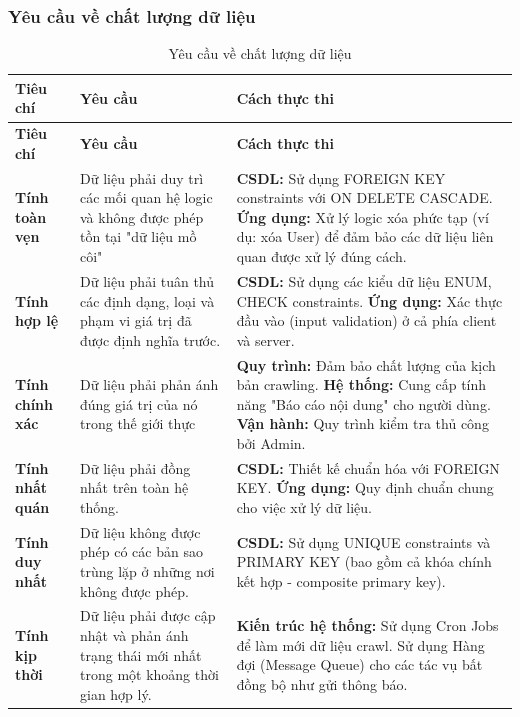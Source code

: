 \subsubsection{Yêu cầu về chất lượng dữ liệu}
\begin{longtable}{|p{3cm}|p{5.5cm}|p{6cm}|}
    \caption{Yêu cầu về chất lượng dữ liệu} \label{tab:data_quality} \\
    \hline
    \textbf{Tiêu chí} & \textbf{Yêu cầu} & \textbf{Cách thực thi} \\
    \hline
    \endfirsthead
    
    \hline
    \textbf{Tiêu chí} & \textbf{Yêu cầu} & \textbf{Cách thực thi} \\
    \hline
    \endhead

    \hline
    \endlastfoot

    \textbf{Tính toàn vẹn} & Dữ liệu phải duy trì các mối quan hệ logic và không được phép tồn tại "dữ liệu mồ côi" & \textbf{CSDL:} Sử dụng FOREIGN KEY constraints với ON DELETE CASCADE. \newline \textbf{Ứng dụng:} Xử lý logic xóa phức tạp (ví dụ: xóa User) để đảm bảo các dữ liệu liên quan được xử lý đúng cách. \\
    \hline
    \textbf{Tính hợp lệ} & Dữ liệu phải tuân thủ các định dạng, loại và phạm vi giá trị đã được định nghĩa trước. & \textbf{CSDL:} Sử dụng các kiểu dữ liệu ENUM, CHECK constraints. \newline \textbf{Ứng dụng:} Xác thực đầu vào (input validation) ở cả phía client và server. \\
    \hline
    \textbf{Tính chính xác} & Dữ liệu phải phản ánh đúng giá trị của nó trong thế giới thực & \textbf{Quy trình:} Đảm bảo chất lượng của kịch bản crawling. \newline \textbf{Hệ thống:} Cung cấp tính năng "Báo cáo nội dung" cho người dùng. \newline \textbf{Vận hành:} Quy trình kiểm tra thủ công bởi Admin. \\
    \hline
    \textbf{Tính nhất quán} & Dữ liệu phải đồng nhất trên toàn hệ thống. & \textbf{CSDL:} Thiết kế chuẩn hóa với FOREIGN KEY. \newline \textbf{Ứng dụng:} Quy định chuẩn chung cho việc xử lý dữ liệu. \\
    \hline
    \textbf{Tính duy nhất} & Dữ liệu không được phép có các bản sao trùng lặp ở những nơi không được phép. & \textbf{CSDL:} Sử dụng UNIQUE constraints và PRIMARY KEY (bao gồm cả khóa chính kết hợp - composite primary key). \\
    \hline
    \textbf{Tính kịp thời} & Dữ liệu phải được cập nhật và phản ánh trạng thái mới nhất trong một khoảng thời gian hợp lý. & \textbf{Kiến trúc hệ thống:} Sử dụng Cron Jobs để làm mới dữ liệu crawl. Sử dụng Hàng đợi (Message Queue) cho các tác vụ bất đồng bộ như gửi thông báo. \\
    \hline
\end{longtable}
